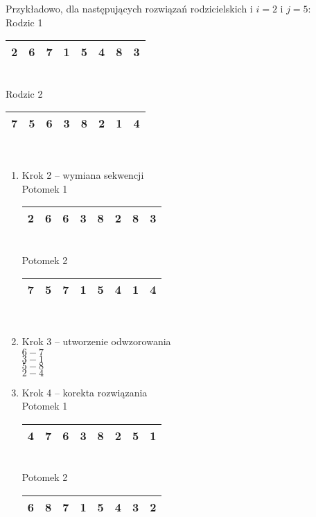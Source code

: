 \documentclass[12pt, a4paper]{article}
\begin{document}
Przykładowo, dla następujących rozwiązań rodzicielskich i $i = 2$ i $j = 5$:\\

Rodzic 1
\begin{tabular}{ | c | c | c | c | c | c | c | c |}
  \hline
  2 & 6 &  \cellcolor{green!25}7 & \cellcolor{green!25}1 & \cellcolor{green!25}5 & \cellcolor{green!25}4 & 8 & 3 \\ \hline
\end{tabular}\\

Rodzic 2
\begin{tabular}{ | c | c | c | c | c | c | c | c |}
  \hline
  7 & 5 & \cellcolor{blue!25}6 & \cellcolor{blue!25}3 & \cellcolor{blue!25}8 & \cellcolor{blue!25}2 & 1 & 4 \\ \hline
\end{tabular}\\

\begin{enumerate}
 	\item Krok 2 -- wymiana sekwencji\\
Potomek 1
\begin{tabular}{ | c | c | c | c | c | c | c | c |}
  \hline
  2 & 6 & \cellcolor{blue!25}6 & \cellcolor{blue!25}3 & \cellcolor{blue!25}8 & \cellcolor{blue!25}2 & 8 & 3 \\ \hline
\end{tabular}\\

Potomek 2
\begin{tabular}{ | c | c | c | c | c | c | c | c |}
  \hline
  7 & 5 &  \cellcolor{green!25}7 & \cellcolor{green!25}1 & \cellcolor{green!25}5 & \cellcolor{green!25}4 & 1 & 4 \\ \hline
\end{tabular}\\

\item Krok 3 -- utworzenie odwzorowania\\
$6 - 7$\\
$3 - 1$\\
$5 - 8$\\
$2 - 4$\\

\item Krok 4 -- korekta rozwiązania\\
Potomek 1
\begin{tabular}{ | c | c | c | c | c | c | c | c |}
  \hline
  4 & 7 & \cellcolor{blue!25}6 & \cellcolor{blue!25}3 & \cellcolor{blue!25}8 & \cellcolor{blue!25}2 & 5 & 1 \\ \hline
\end{tabular}\\

Potomek 2
\begin{tabular}{ | c | c | c | c | c | c | c | c |}
  \hline
  6 & 8 &  \cellcolor{green!25}7 & \cellcolor{green!25}1 & \cellcolor{green!25}5 & \cellcolor{green!25}4 & 3 & 2 \\ \hline
\end{tabular}\\
\end{enumerate}
\end{document}
